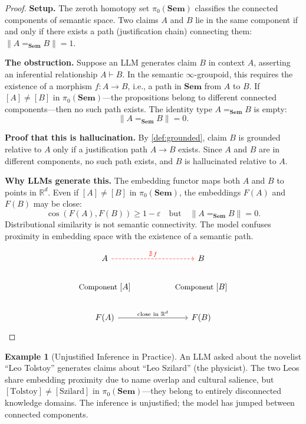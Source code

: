\documentclass[11pt,a4paper]{article}
\theoremstyle{plain}
\theoremstyle{definition}
\newtheorem{example}[theorem]{Example}
\theoremstyle{remark}
\newcommand{\Sem}{\mathbf{Sem}}
\newcommand{\R}{\mathbb{R}}
\begin{document}
\begin{proof}
\textbf{Setup.} The zeroth homotopy set $\pi_0(\Sem)$ classifies the connected components of semantic space. Two claims $A$ and $B$ lie in the same component if and only if there exists a path (justification chain) connecting them: $\|A =_{\Sem} B\| = 1$.

\textbf{The obstruction.} Suppose an LLM generates claim $B$ in context $A$, asserting an inferential relationship $A \vdash B$. In the semantic $\infty$-groupoid, this requires the existence of a morphism $f: A \to B$, i.e., a path in $\Sem$ from $A$ to $B$. If $[A] \neq [B]$ in $\pi_0(\Sem)$---the propositions belong to different connected components---then no such path exists. The identity type $A =_{\Sem} B$ is empty:
\begin{equation}
\|A =_{\Sem} B\| = 0.
\end{equation}

\textbf{Proof that this is hallucination.} By \cref{def:grounded}, claim $B$ is grounded relative to $A$ only if a justification path $A \to B$ exists. Since $A$ and $B$ are in different components, no such path exists, and $B$ is hallucinated relative to $A$.

\textbf{Why LLMs generate this.} The embedding functor maps both $A$ and $B$ to points in $\R^d$. Even if $[A] \neq [B]$ in $\pi_0(\Sem)$, the embeddings $F(A)$ and $F(B)$ may be close:
\[
\cos(F(A), F(B)) \geq 1 - \varepsilon \quad \text{but} \quad \|A =_{\Sem} B\| = 0.
\]
Distributional similarity is not semantic connectivity. The model confuses proximity in embedding space with the existence of a semantic path.

\[
\begin{tikzcd}[column sep=3cm, row sep=2cm]
A \arrow[r, dashed, "\nexists\,f", red] \arrow[d, phantom, "\text{\small Component } {[A]}"] & B \arrow[d, phantom, "\text{\small Component } {[B]}"] \\
F(A) \arrow[r, "\text{close in } \R^d"] & F(B)
\end{tikzcd}
\]
\end{proof}

\begin{example}[Unjustified Inference in Practice]
\label{ex:unjustified}
An LLM asked about the novelist ``Leo Tolstoy'' generates claims about ``Leo Szilard'' (the physicist). The two Leos share embedding proximity due to name overlap and cultural salience, but $[\text{Tolstoy}] \neq [\text{Szilard}]$ in $\pi_0(\Sem)$---they belong to entirely disconnected knowledge domains. The inference is unjustified; the model has jumped between connected components.
\end{example}
\end{document}
